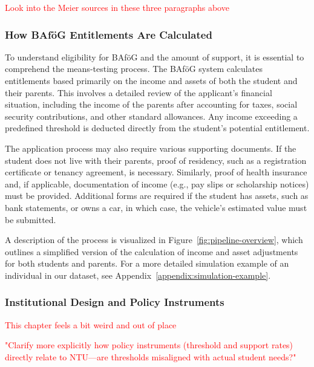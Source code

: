 \textcolor{red}{Look into the Meier sources in these three paragraphs above}


\subsubsection{How BAföG Entitlements Are Calculated}
\label{subsection:how-bafog-entitlement-is-calculated}
To understand eligibility for BAföG and the amount of support, it is essential to comprehend the means-testing process. 
The BAföG system calculates entitlements based primarily on the income and assets of both the student and their parents. 
This involves a detailed review of the applicant’s financial situation, including the income of the parents after accounting for taxes, social security contributions, and other standard allowances. 
Any income exceeding a predefined threshold is deducted directly from the student’s potential entitlement.

The application process may also require various supporting documents. 
If the student does not live with their parents, proof of residency, such as a registration certificate or tenancy agreement, is necessary. 
Similarly, proof of health insurance and, if applicable, documentation of income (e.g., pay slips or scholarship notices) must be provided. 
Additional forms are required if the student has assets, such as bank statements, or owns a car, in which case, the vehicle’s estimated value must be submitted.

A description of the process is visualized in Figure~\ref{fig:pipeline-overview}, which outlines a simplified version of the calculation of income and asset adjustments for both students and parents.
For a more detailed simulation example of an individual in our dataset, see Appendix~\ref{appendix:simulation-example}.


\subsubsection{Institutional Design and Policy Instruments} 
\label{section:institutional-design-and-policy-instruments}

\textcolor{red}{This chapter feels a bit weird and out of place}

\textcolor{red}{"Clarify more explicitly how policy instruments (threshold and support rates) directly relate to NTU—are thresholds misaligned with actual student needs?"}

